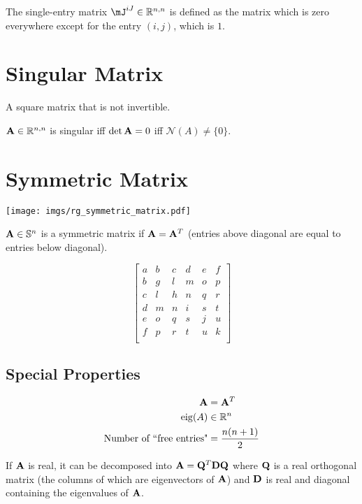 The single-entry matrix $\mJ^{iJ}\in\sRnn$ is defined as the matrix which is zero everywhere except for the entry $(i,j)$, which is $1$.





\section{Singular Matrix}
A square matrix that is not invertible.

$\mathbf{A}\in\mathbb{R}^{n,n}$ is singular iff $\det \mathbf{A}=0$ iff $\mathcal{N}(A)\ne\{0\}$.


\section{Symmetric Matrix}

\begin{center}
\texttt{[image: imgs/rg\_symmetric\_matrix.pdf]}
\end{center}

$\mathbf{A}\in\mathbb{S}^{n}$ is a symmetric matrix if $\mathbf{A}=\mathbf{A}^T$ (entries above diagonal are equal to entries below diagonal).

\begin{equation}
\begin{bmatrix}
a & b & c & d & e & f \\
b & g & l & m & o & p \\
c & l & h & n & q & r \\
d & m & n & i & s & t \\
e & o & q & s & j & u \\
f & p & r & t & u & k \\
\end{bmatrix}
\end{equation}


\subsection*{Special Properties}

\begin{align}
\mathbf{A}                                &=   \mathbf{A}^T \\
\operatorname{eig}(A)                            &\in \mathbb{R}^{n}  \\
\textrm{Number of ``free entries"} &=    \frac{n(n+1)}{2}
\end{align}

If $\mathbf{A}$ is real, it can be decomposed into $\mathbf{A}=\mathbf{Q}^T\mathbf{D}\mathbf{Q}$ where $\mathbf{Q}$ is a real orthogonal matrix (the columns of which are eigenvectors of $\mathbf{A}$) and $\mathbf{D}$ is real and diagonal containing the eigenvalues of $\mathbf{A}$.

